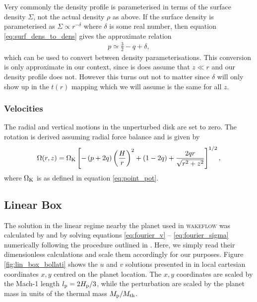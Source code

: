 Very commonly the density profile is parameterised in terms of the surface density $\Sigma$, not the actual density $\rho$ as above.
If the surface density is parameterised as $\Sigma \propto r^{-\delta}$ where $\delta$ is some real number, then equation \ref{eq:surf_dens_to_dens} gives the approximate relation 
\begin{align}
    p \simeq \frac{3}{2} - q + \delta,
\end{align}
which can be used to convert between density parameterisations.
This conversion is only approximate in our context, since is does assume that $z \ll r$ and our density profile does not.
However this turns out not to matter since $\delta$ will only show up in the $t(r)$ mapping which we will assume is the same for all $z$.

\subsubsection{Velocities}

The radial and vertical motions in the unperturbed disk are set to zero. 
The rotation is derived assuming radial force balance \citep[e.g.][]{nelson2013} and is given by 
\begin{align}
    \Omega(r,z) = \Omega_{\rm K} \left[ - \left(p + 2q\right) \left( \frac{H}{r} \right)^2 + \left( 1-2q \right) + \frac{2qr}{\sqrt{r^2 + z^2}}\right]^{1/2}, \label{eq:omega_wf_ps}
\end{align}
where $\Omega_{\rm K}$ is as defined in equation \ref{eq:point_pot}.

\subsection{Linear Box} \label{sec:linear_box}

The solution in the linear regime nearby the planet used in \textsc{wakeflow} was calculated by \citet{bollati2020} and \citet{bollati2021} by solving equations \ref{eq:fourier_v} -- \ref{eq:fourier_sigma} numerically following the procedure outlined in \citet{goodman2001}.
Here, we simply read their dimensionless calculations and scale them accordingly for our purposes. Figure \ref{fig:lin_box_bollati} shows the $u$ and $v$ solutions presented in \citet{bollati2021} in local cartesian coordinates $x,y$ centred on the planet location.
The $x,y$ coordinates are scaled by the Mach-1 length $l_{\rm p} = 2H_{\rm p}/3$, while the perturbation are scaled by the planet mass in units of the thermal mass $M_{\rm p} / M_{\rm th}$.

